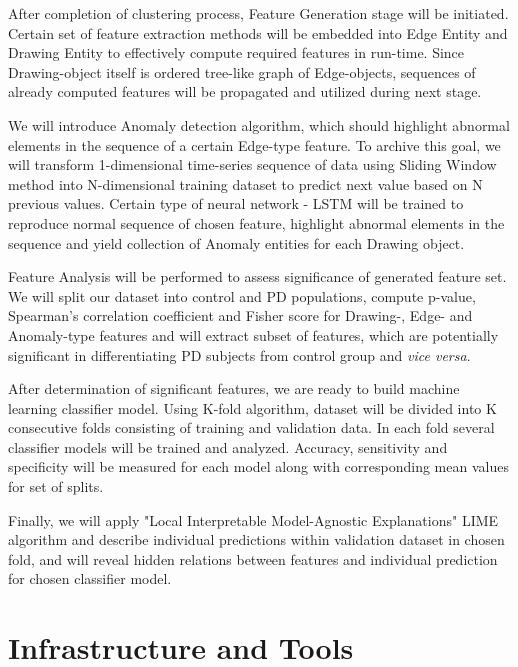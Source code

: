 After completion of clustering process, Feature Generation stage will be initiated. Certain set of feature extraction methods will be embedded into Edge Entity and Drawing Entity to effectively compute required features in run-time. Since Drawing-object itself is ordered tree-like graph of Edge-objects, sequences of already computed features will be propagated and utilized during next stage.

We will introduce Anomaly detection algorithm, which should highlight abnormal elements in the sequence of a certain Edge-type feature. To archive this goal, we will transform 1-dimensional time-series sequence of data using Sliding Window method into N-dimensional training dataset to predict next value based on N previous values. Certain type of neural network - LSTM will be trained to reproduce normal sequence of chosen feature, highlight abnormal elements in the sequence and yield collection of Anomaly entities for each Drawing object.

Feature Analysis will be performed to assess significance of generated feature set. We will split our dataset into control and PD populations, compute p-value, Spearman's correlation coefficient and Fisher score for Drawing-, Edge- and Anomaly-type features and will extract subset of features, which are potentially significant in differentiating PD subjects from control group and \textit{vice versa}.

After determination of significant features, we are ready to build machine learning classifier model. Using K-fold algorithm, dataset will be divided into K consecutive folds consisting of training and validation data. In each fold several classifier models will be trained and analyzed. Accuracy, sensitivity and specificity will be measured for each model along with corresponding mean values for set of splits.

Finally, we will apply "Local Interpretable Model-Agnostic Explanations" LIME algorithm \cite{ribeiro2016should} and describe individual predictions within validation dataset in chosen fold, and will reveal hidden relations between features and individual prediction for chosen classifier model.




\section{Infrastructure and Tools}

